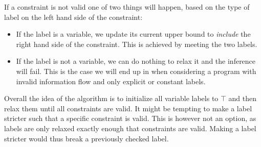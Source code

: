 If a constraint is not valid one of two things will happen, based on the type of label on the left hand side of the constraint:
\begin{itemize}
  \item If the label is a variable, we update its current upper bound to \textit{include} the right hand side of the constraint.
  This is achieved by meeting the two labels.
  \item If the label is not a variable, we can do nothing to relax it and the inference will fail.
  This is the case we will end up in when considering a program with invalid information flow and only explicit or constant labels.
\end{itemize}

Overall the idea of the algorithm is to initialize all variable labels to $\top$ and then relax them until all constraints are valid.
It might be tempting to make a label stricter such that a specific constraint is valid.
This is however not an option, as labels are only relaxed exactly enough that constraints are valid.
Making a label stricter would thus break a previously checked label.

